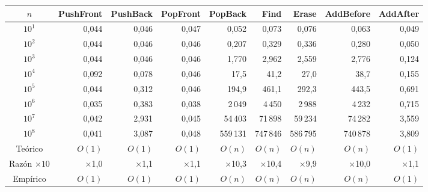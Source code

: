 \begin{tabular}{crrrrrrrr}
\toprule
$n$ & \textbf{PushFront} & \textbf{PushBack} & \textbf{PopFront} & \textbf{PopBack} & \textbf{Find} & \textbf{Erase} & \textbf{AddBefore} & \textbf{AddAfter} \\
\midrule
$10^{1}$ & 0{,}044 & 0{,}046 & 0{,}047 & 0{,}052 & 0{,}073 & 0{,}076 & 0{,}063 & 0{,}049 \\
$10^{2}$ & 0{,}044 & 0{,}046 & 0{,}046 & 0{,}207 & 0{,}329 & 0{,}336 & 0{,}280 & 0{,}050 \\
$10^{3}$ & 0{,}044 & 0{,}046 & 0{,}046 & 1{,}770 & 2{,}962 & 2{,}559 & 2{,}776 & 0{,}124 \\
$10^{4}$ & 0{,}092 & 0{,}078 & 0{,}046 & 17{,}5 & 41{,}2 & 27{,}0 & 38{,}7 & 0{,}155 \\
$10^{5}$ & 0{,}044 & 0{,}312 & 0{,}046 & 194{,}9 & 461{,}1 & 292{,}3 & 443{,}5 & 0{,}691 \\
$10^{6}$ & 0{,}035 & 0{,}383 & 0{,}038 & 2\,049 & 4\,450 & 2\,988 & 4\,232 & 0{,}715 \\
$10^{7}$ & 0{,}042 & 2{,}931 & 0{,}045 & 54\,403 & 71\,898 & 59\,234 & 74\,282 & 3{,}559 \\
$10^{8}$ & 0{,}041 & 3{,}087 & 0{,}048 & 559\,131 & 747\,846 & 586\,795 & 740\,878 & 3{,}809 \\
\midrule
Teórico & $O(1)$ & $O(1)$ & $O(1)$ & $O(n)$ & $O(n)$ & $O(n)$ & $O(n)$ & $O(1)$ \\
Razón $\times 10$ & $\times$1{,}0 & $\times$1{,}1 & $\times$1{,}1 & $\times$10{,}3 & $\times$10{,}4 & $\times$9{,}9 & $\times$10{,}0 & $\times$1{,}1 \\
Empírico & $O(1)$ & $O(1)$ & $O(1)$ & $O(n)$ & $O(n)$ & $O(n)$ & $O(n)$ & $O(1)$ \\
\bottomrule
\end{tabular}